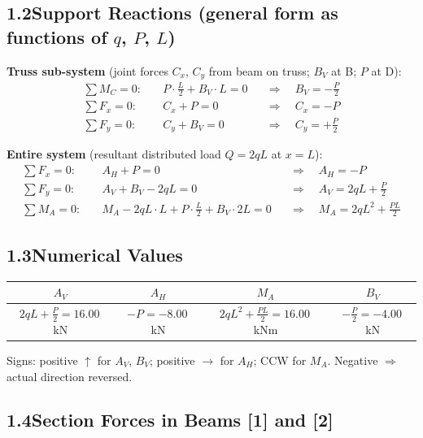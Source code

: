 \documentclass[a4paper,11pt]{article}
\begin{document}
\subsection*{1.2\quad Support Reactions (general form as functions of $q$, $P$, $L$)}

\textbf{Truss sub-system}
(joint forces $C_x$, $C_y$ from beam on truss; $B_V$ at B; $P$ at D):
\begin{align*}
  \sum M_C = 0:\quad & P \cdot \tfrac{L}{2} + B_V \cdot L = 0
    &&\Rightarrow\quad \boxed{B_V = -\tfrac{P}{2}} \\
  \sum F_x = 0:\quad & C_x + P = 0
    &&\Rightarrow\quad C_x = -P \\
  \sum F_y = 0:\quad & C_y + B_V = 0
    &&\Rightarrow\quad C_y = +\tfrac{P}{2}
\end{align*}

\textbf{Entire system} (resultant distributed load $Q = 2qL$ at $x = L$):
\begin{align*}
  \sum F_x = 0:\quad & A_H + P = 0
    &&\Rightarrow\quad \boxed{A_H = -P} \\
  \sum F_y = 0:\quad & A_V + B_V - 2qL = 0
    &&\Rightarrow\quad \boxed{A_V = 2qL + \tfrac{P}{2}} \\
  \sum M_A = 0:\quad & M_A - 2qL \cdot L + P\cdot\tfrac{L}{2} + B_V \cdot 2L = 0
    &&\Rightarrow\quad \boxed{M_A = 2qL^2 + \tfrac{PL}{2}}
\end{align*}

\subsection*{1.3\quad Numerical Values}

\begin{center}
\begin{tabular}{cccc}
\toprule
$A_V$ & $A_H$ & $M_A$ & $B_V$ \\
\midrule
$2qL + \tfrac{P}{2} = \mathbf{16.00}$\,kN
& $-P = \mathbf{-8.00}$\,kN
& $2qL^2 + \tfrac{PL}{2} = \mathbf{16.00}$\,kNm
& $-\tfrac{P}{2} = \mathbf{-4.00}$\,kN \\
\bottomrule
\end{tabular}
\end{center}

Signs: positive $\uparrow$ for $A_V$, $B_V$; positive $\rightarrow$ for $A_H$;
CCW for $M_A$. Negative $\Rightarrow$ actual direction reversed.

\subsection*{1.4\quad Section Forces in Beams [1] and [2]}
\end{document}
